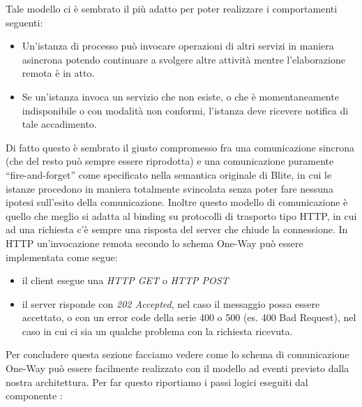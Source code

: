 Tale modello ci \`e sembrato il più adatto per poter realizzare i 
comportamenti seguenti:

\begin{itemize}
  \item Un'istanza di processo può invocare operazioni di altri servizi in
  maniera asincrona potendo continuare a svolgere altre attività mentre
  l'elaborazione remota \`e in atto.
  
  \item Se un'istanza invoca un servizio che non esiste, o che \`e
  momentaneamente indisponibile o con modalità non conformi, l'istanza deve
  ricevere notifica di tale accadimento.
\end{itemize}

Di fatto questo \`e sembrato il giusto compromesso fra una comunicazione
sincrona (che del resto può sempre essere riprodotta) e una comunicazione puramente
``fire-and-forget'' come specificato nella semantica originale di Blite, in cui le
istanze procedono in maniera totalmente svincolata senza poter fare nessuna
ipotesi sull'esito della comunicazione. Inoltre questo modello di
comunicazione \`e quello che meglio si adatta al binding su protocolli di
trasporto tipo HTTP, in cui ad una richiesta c'è sempre una risposta del
server che chiude la connessione. In HTTP un'invocazione remota secondo lo
schema One-Way può essere implementata come segue:

\begin{itemize}
  \item il client esegue una \emph{HTTP GET} o \emph{HTTP POST}
  \item il server risponde con \emph{202 Accepted}, nel caso il messaggio possa
  essere accettato, o con un error code della serie 400 o 500 (es. 400 Bad
  Request), nel caso in cui ci sia un qualche problema con la richiesta
  ricevuta.
\end{itemize}


Per concludere questa sezione facciamo vedere come lo schema di comunicazione
One-Way può essere facilmente realizzato con il modello ad eventi previsto
dalla nostra architettura. Per far questo riportiamo i passi logici eseguiti
dal componente :

